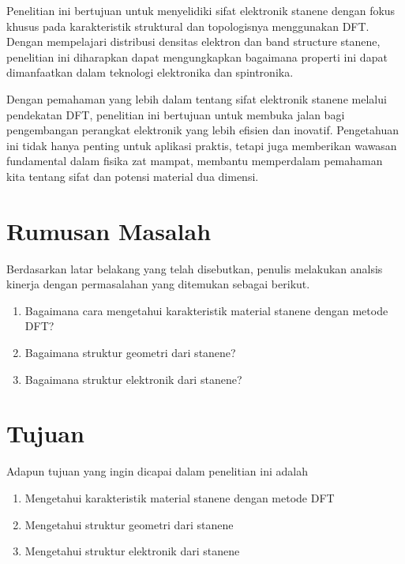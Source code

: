 Penelitian ini bertujuan untuk menyelidiki sifat elektronik stanene dengan fokus khusus pada karakteristik struktural dan topologisnya menggunakan DFT. Dengan mempelajari distribusi densitas elektron dan band structure stanene, penelitian ini diharapkan dapat mengungkapkan bagaimana properti ini dapat dimanfaatkan dalam teknologi elektronika dan spintronika.

Dengan pemahaman yang lebih dalam tentang sifat elektronik stanene melalui pendekatan DFT, penelitian ini bertujuan untuk membuka jalan bagi pengembangan perangkat elektronik yang lebih efisien dan inovatif. Pengetahuan ini tidak hanya penting untuk aplikasi praktis, tetapi juga memberikan wawasan fundamental dalam fisika zat mampat, membantu memperdalam pemahaman kita tentang sifat dan potensi material dua dimensi.


\section{Rumusan Masalah}

Berdasarkan latar belakang yang telah disebutkan, penulis melakukan analsis kinerja dengan permasalahan yang ditemukan sebagai berikut.
\begin{enumerate}[noitemsep]
      \item Bagaimana cara mengetahui karakteristik material stanene dengan metode DFT?
      \item Bagaimana struktur geometri dari stanene?
      \item Bagaimana struktur elektronik dari stanene?
\end{enumerate}

\section{Tujuan}

Adapun tujuan yang ingin dicapai dalam penelitian ini adalah
\begin{enumerate}[noitemsep]
    \item  Mengetahui karakteristik material stanene dengan metode DFT
    \item  Mengetahui struktur geometri dari stanene
    \item  Mengetahui struktur elektronik dari stanene
\end{enumerate}


